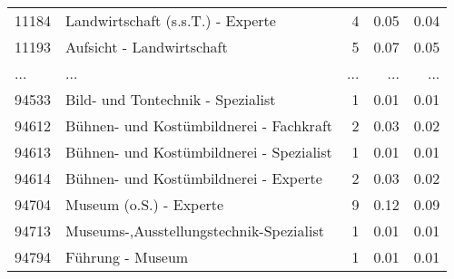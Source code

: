 \begin{longtable}{lXrrr}
        11184 & \multicolumn{1}{X}{Landwirtschaft (s.s.T.) - Experte} & %
          \num{4} &
          \num[round-mode=places,round-precision=2]{0.05} &
          \num[round-mode=places,round-precision=2]{0.04} \\
        11193 & \multicolumn{1}{X}{Aufsicht - Landwirtschaft} & %
          \num{5} &
          \num[round-mode=places,round-precision=2]{0.07} &
          \num[round-mode=places,round-precision=2]{0.05} \\
       ... & ... & ... & ... & ... \\
        94533 & \multicolumn{1}{X}{Bild- und Tontechnik - Spezialist} & %
          \num{1} &
          \num[round-mode=places,round-precision=2]{0.01} &
          \num[round-mode=places,round-precision=2]{0.01} \\

        94612 & \multicolumn{1}{X}{Bühnen- und Kostümbildnerei - Fachkraft} & %
          \num{2} &
          \num[round-mode=places,round-precision=2]{0.03} &
          \num[round-mode=places,round-precision=2]{0.02} \\

        94613 & \multicolumn{1}{X}{Bühnen- und Kostümbildnerei - Spezialist} & %
          \num{1} &
          \num[round-mode=places,round-precision=2]{0.01} &
          \num[round-mode=places,round-precision=2]{0.01} \\

        94614 & \multicolumn{1}{X}{Bühnen- und Kostümbildnerei - Experte} & %
          \num{2} &
          \num[round-mode=places,round-precision=2]{0.03} &
          \num[round-mode=places,round-precision=2]{0.02} \\

        94704 & \multicolumn{1}{X}{Museum (o.S.) - Experte} & %
          \num{9} &
          \num[round-mode=places,round-precision=2]{0.12} &
          \num[round-mode=places,round-precision=2]{0.09} \\

        94713 & \multicolumn{1}{X}{Museums-,Ausstellungstechnik-Spezialist} & %
          \num{1} &
          \num[round-mode=places,round-precision=2]{0.01} &
          \num[round-mode=places,round-precision=2]{0.01} \\

        94794 & \multicolumn{1}{X}{Führung - Museum} & %
          \num{1} &
          \num[round-mode=places,round-precision=2]{0.01} &
          \num[round-mode=places,round-precision=2]{0.01} \\


\end{longtable}
